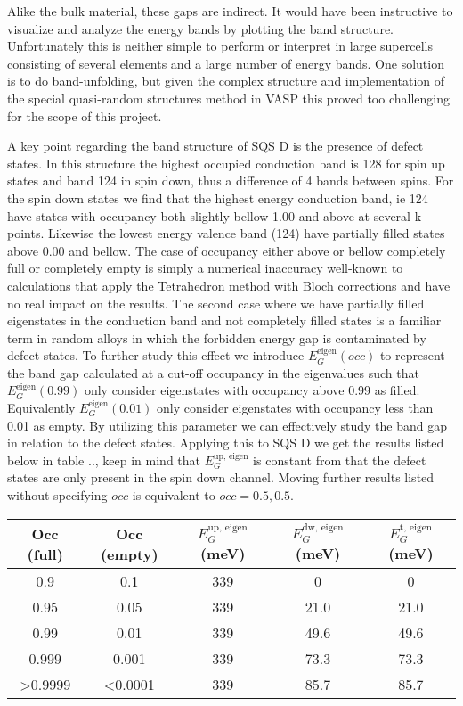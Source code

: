 Alike the bulk material, these gaps are indirect. It would have been instructive to visualize and analyze the energy bands by plotting the band structure. Unfortunately this is neither simple to perform or interpret in large supercells consisting of several elements and a large number of energy bands. One solution is to do band-unfolding, but given the complex structure and implementation of the special quasi-random structures method in VASP this proved too challenging for the scope of this project. 

A key point regarding the band structure of SQS D is the presence of defect states. In this structure the highest occupied conduction band is 128 for spin up states and band 124 in spin down, thus a difference of 4 bands between spins. For the spin down states we find that the highest energy conduction band, ie 124 have states with occupancy both slightly bellow 1.00 and above at several k-points. Likewise the lowest energy valence band (124) have partially filled states above 0.00 and bellow. The case of occupancy either above or bellow completely full or completely empty is simply a numerical inaccuracy well-known to calculations that apply the Tetrahedron method with Bloch corrections and have no real impact on the results. The second case where we have partially filled eigenstates in the conduction band and not completely filled states is a familiar term in random alloys \cite{PhysRevLett.104.236403} in which the forbidden energy gap is contaminated by defect states. To further study this effect we introduce $E_G ^\text{eigen}(occ)$ to represent the band gap calculated at a cut-off occupancy in the eigenvalues such that $E_G ^\text{eigen}(0.99)$ only consider eigenstates with occupancy above 0.99 as filled. Equivalently $E_G ^\text{eigen}(0.01)$ only consider eigenstates with occupancy less than 0.01 as empty. By utilizing this parameter we can effectively study the band gap in relation to the defect states. Applying this to SQS D we get the results listed below in table .., keep in mind that $E_G ^\text{up, eigen}$ is constant from that the defect states are only present in the spin down channel. Moving further results listed without specifying $occ$ is equivalent to $occ = 0.5, 0.5$.

\begin{table}[H]
\centering
\begin{tabular}{@{}ccccc@{}}
\toprule
Occ (full)          & Occ (empty)      & $E_G ^\text{up, eigen}$ (meV)  & $E_G ^\text{dw, eigen}$ (meV) & $E_G ^\text{t, eigen}$ (meV) \\ \midrule
0.9                 & 0.1              & 339 & 0    & 0     \\
0.95                & 0.05             & 339 & 21.0 & 21.0  \\
0.99                & 0.01             & 339 & 49.6 & 49.6  \\
0.999               & 0.001            & 339 & 73.3 & 73.3  \\
\textgreater 0.9999 & \textless 0.0001 & 339 & 85.7 & 85.7  \\ \bottomrule
\end{tabular}
\end{table}


